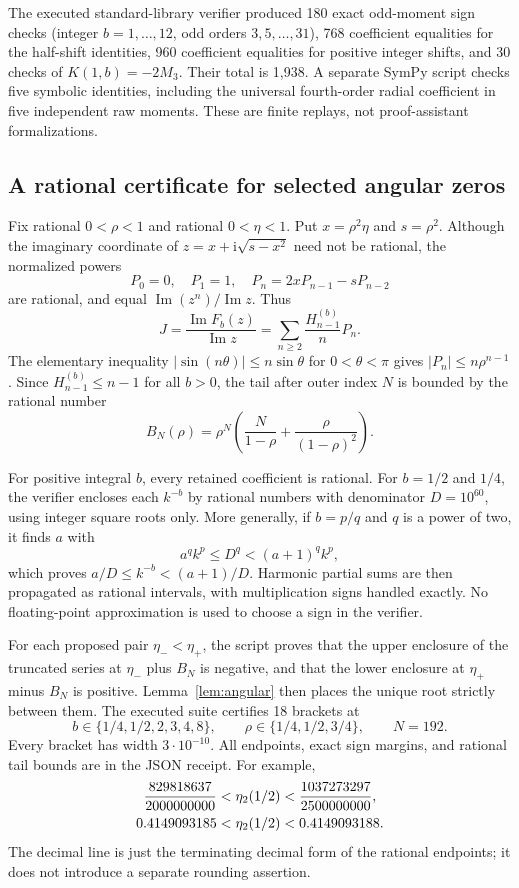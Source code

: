 \documentclass[11pt]{article}
\numberwithin{equation}{section}
\theoremstyle{definition}
\theoremstyle{remark}
\DeclareMathOperator{\Imn}{Im}
\newcommand{\ii}{\mathrm i}
\begin{document}
The executed standard-library verifier produced 180 exact odd-moment
sign checks (integer $b=1,\ldots,12$, odd orders $3,5,\ldots,31$),
768 coefficient equalities for the half-shift identities, 960 coefficient
equalities for positive integer shifts, and 30 checks of
$K(1,b)=-2M_3$. Their total is 1,938. A separate SymPy script checks
five symbolic identities, including the universal fourth-order radial
coefficient in five independent raw moments. These are finite replays,
not proof-assistant formalizations.

\subsection{A rational certificate for selected angular zeros}
Fix rational $0<\rho<1$ and rational $0<\eta<1$. Put
$x=\rho^2\eta$ and $s=\rho^2$. Although the imaginary coordinate of
$z=x+\ii\sqrt{s-x^2}$ need not be rational, the normalized powers
\[
 P_0=0,\quad P_1=1,\quad P_n=2xP_{n-1}-sP_{n-2}
\]
are rational, and equal $\Imn(z^n)/\Imn z$. Thus
\begin{equation}\label{eq:certificate-series}
 J=\frac{\Imn F_b(z)}{\Imn z}
      =\sum_{n\ge2}\frac{H_{n-1}^{(b)}}nP_n.
\end{equation}
The elementary inequality $|\sin(n\theta)|\le n\sin\theta$ for
$0<\theta<\pi$ gives $|P_n|\le n\rho^{n-1}$.
Since $H_{n-1}^{(b)}\le n-1$ for all $b>0$, the tail after outer
index $N$ is bounded by the rational number
\begin{equation}\label{eq:rationaltail}
 B_N(\rho)=\rho^N\left(\frac N{1-\rho}
                       +\frac{\rho}{(1-\rho)^2}\right).
\end{equation}

For positive integral $b$, every retained coefficient is rational.
For $b=1/2$ and $1/4$, the verifier encloses each $k^{-b}$ by rational
numbers with denominator $D=10^{60}$, using integer square roots only.
More generally, if $b=p/q$ and $q$ is a power of two, it finds $a$ with
\[
 a^q k^p\le D^q<(a+1)^q k^p,
\]
which proves $a/D\le k^{-b}<(a+1)/D$. Harmonic partial sums are then
propagated as rational intervals, with multiplication signs handled
exactly. No floating-point approximation is used to choose a sign in
the verifier.

For each proposed pair $\eta_-<\eta_+$, the script proves that the
upper enclosure of the truncated series at $\eta_-$ plus $B_N$ is
negative, and that the lower enclosure at $\eta_+$ minus $B_N$ is
positive. Lemma~\ref{lem:angular} then places the unique root strictly
between them. The executed suite certifies 18 brackets at
\[
 b\in\{1/4,1/2,2,3,4,8\},\qquad
 \rho\in\{1/4,1/2,3/4\},\qquad N=192.
\]
Every bracket has width $3\cdot10^{-10}$. All endpoints, exact sign
margins, and rational tail bounds are in the JSON receipt. For example,
\begin{align}
 \frac{829818637}{2000000000}
 &<\eta_2(1/2)<\frac{1037273297}{2500000000},
       \label{eq:examplebracket}\\
 0.4149093185&<\eta_2(1/2)<0.4149093188.\notag
\end{align}
The decimal line is just the terminating decimal form of the rational
endpoints; it does not introduce a separate rounding assertion.
\end{document}
